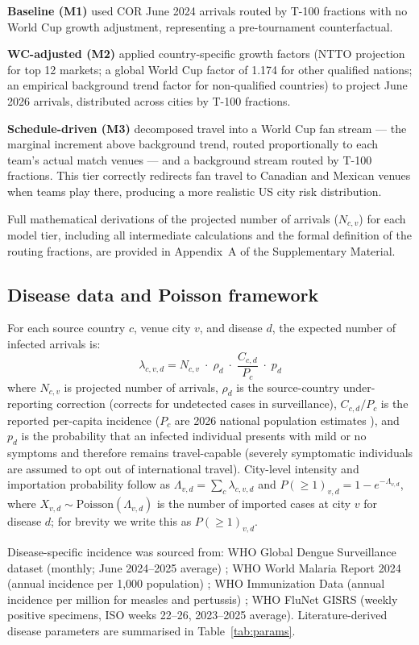 \documentclass[12pt, a4paper]{article}
\begin{document}
\textbf{Baseline (M1)} used COR June 2024 arrivals routed by T-100 fractions with no World Cup growth adjustment, representing a pre-tournament counterfactual.

\textbf{WC-adjusted (M2)} applied country-specific growth factors (NTTO projection for top 12 markets; a global World Cup factor of 1.174 for other qualified nations; an empirical background trend factor for non-qualified countries) to project June 2026 arrivals, distributed across cities by T-100 fractions.

\textbf{Schedule-driven (M3)} decomposed travel into a World Cup fan stream --- the marginal increment above background trend, routed proportionally to each team's actual match venues --- and a background stream routed by T-100 fractions. This tier correctly redirects fan travel to Canadian and Mexican venues when teams play there, producing a more realistic US city risk distribution. 

Full mathematical derivations of the projected number of arrivals ($N_{c,v}$) for each model tier, including all intermediate calculations and the formal definition of the routing fractions, are provided in Appendix~A of the Supplementary Material.

\subsection{Disease data and Poisson framework}

For each source country $c$, venue city $v$, and disease $d$, the expected number of infected arrivals is:
\[
  \lambda_{c,v,d}
    = N_{c,v} \;\cdot\; \rho_d \;\cdot\; \frac{C_{c,d}}{P_c}
               \;\cdot\; p_d
\]
where $N_{c,v}$ is projected number of arrivals, $\rho_d$ is the source-country under-reporting correction (corrects for undetected cases in surveillance), $C_{c,d}/P_c$ is the reported per-capita incidence ($P_c$ are 2026 national population estimates \citep{Worldometers2026pop}), and $p_d$ is the probability that an infected individual presents with mild or no symptoms and therefore remains travel-capable (severely symptomatic individuals are assumed to opt out of international travel). City-level intensity and importation probability follow as $\Lambda_{v,d} = \sum_c \lambda_{c,v,d}$ and $P(\geq 1)_{v,d} = 1 - e^{-\Lambda_{v,d}}$, where $X_{v,d} \sim \mathrm{Poisson}(\Lambda_{v,d})$ is the number of imported cases at city $v$ for disease $d$; for brevity we write this as $P(\geq 1)_{v,d}$.

Disease-specific incidence was sourced from: WHO Global Dengue Surveillance dataset (monthly; June 2024--2025 average) \citep{WHO_dengue}; WHO World Malaria Report 2024 (annual incidence per 1,000 population) \citep{whoWMR2024}; WHO Immunization Data (annual incidence per million for measles and pertussis) \citep{WHO_immunization}; WHO FluNet GISRS (weekly positive specimens, ISO weeks 22--26, 2023--2025 average). Literature-derived disease parameters are summarised in Table~\ref{tab:params}.
\end{document}
